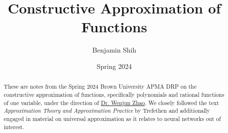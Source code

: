 \documentclass{article}
\title{Constructive Approximation of Functions}
\author{Benjamin Shih}
\date{Spring 2024}
\begin{document}
\begin{titlepage}
\thispagestyle{empty}
\maketitle

\begin{abstract}
These are notes from the Spring 2024 Brown University APMA DRP on the constructive approximation of functions, specifically polynomials and rational functions of one variable, under the direction of \href{https://wenjunzhaowo.github.io}{Dr. Wenjun Zhao}. We closely followed the text \emph{Approximation Theory and Approximation Practice} by Trefethen \cite{atap} and additionally engaged in material on universal approximation as it relates to neural networks out of interest.
\end{abstract}

\tableofcontents
\end{titlepage}




\newpage


\end{document}

